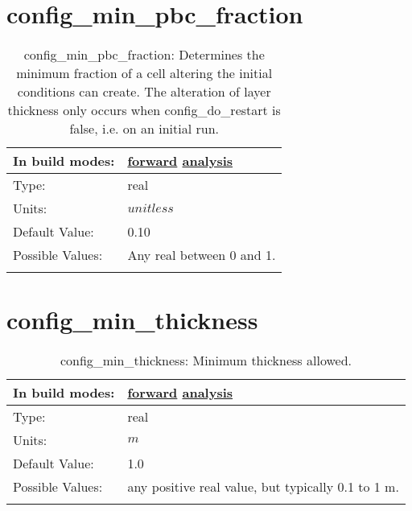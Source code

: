 \section[config\_min\_pbc\_fraction]{config\_min\_pbc\_fraction}
\label{sec:nm_sec_config_min_pbc_fraction}
\begin{center}
\begin{longtable}{| p{2.0in} || p{4.0in} |}
    \hline
    In build modes: & \hyperref[subsec:forward_nm_tab_partial_bottom_cells]{forward} \hyperref[subsec:analysis_nm_tab_partial_bottom_cells]{analysis} \\
    \hline
    Type: & real \\
    \hline
    Units: & $unitless$ \\
    \hline
    Default Value: & 0.10 \\
    \hline
    Possible Values: & Any real between 0 and 1. \\
    \hline
    \caption{config\_min\_pbc\_fraction: Determines the minimum fraction of a cell altering the initial conditions can create.  The alteration of layer thickness only occurs when config\_do\_restart is false, i.e. on an initial run.}
\end{longtable}
\end{center}
\section[config\_min\_thickness]{config\_min\_thickness}
\label{sec:nm_sec_config_min_thickness}
\begin{center}
\begin{longtable}{| p{2.0in} || p{4.0in} |}
    \hline
    In build modes: & \hyperref[subsec:forward_nm_tab_ALE_vertical_grid]{forward} \hyperref[subsec:analysis_nm_tab_ALE_vertical_grid]{analysis} \\
    \hline
    Type: & real \\
    \hline
    Units: & $m$ \\
    \hline
    Default Value: & 1.0 \\
    \hline
    Possible Values: & any positive real value, but typically 0.1 to 1 m. \\
    \hline
    \caption{config\_min\_thickness: Minimum thickness allowed.}
\end{longtable}
\end{center}
